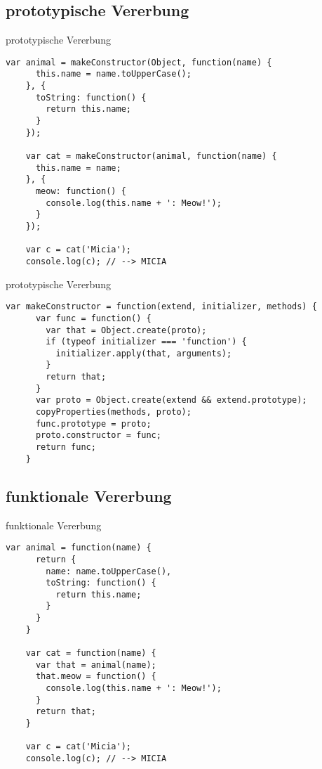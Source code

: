 \subsection{prototypische Vererbung}

\begin{frame}[fragile]{prototypische Vererbung}
  \begin{lstlisting}[gobble=4]
    var animal = makeConstructor(Object, function(name) {
      this.name = name.toUpperCase();
    }, {
      toString: function() {
        return this.name;
      }
    });
    
    var cat = makeConstructor(animal, function(name) {
      this.name = name;
    }, {
      meow: function() {
        console.log(this.name + ': Meow!');
      }
    });
    
    var c = cat('Micia');
    console.log(c); // --> MICIA
  \end{lstlisting}
\end{frame}

\begin{frame}[fragile]{prototypische Vererbung}
  \begin{lstlisting}[gobble=4]
    var makeConstructor = function(extend, initializer, methods) {
      var func = function() {
        var that = Object.create(proto);
        if (typeof initializer === 'function') {
          initializer.apply(that, arguments);
        }
        return that;
      }
      var proto = Object.create(extend && extend.prototype);
      copyProperties(methods, proto);
      func.prototype = proto;
      proto.constructor = func;
      return func;
    }
  \end{lstlisting}
\end{frame}

\subsection{funktionale Vererbung}

\begin{frame}[fragile]{funktionale Vererbung}
  \begin{lstlisting}[gobble=4]
    var animal = function(name) {
      return {
        name: name.toUpperCase(),
        toString: function() {
          return this.name;
        }
      }
    }
    
    var cat = function(name) {
      var that = animal(name);
      that.meow = function() {
        console.log(this.name + ': Meow!');
      }
      return that;
    }
    
    var c = cat('Micia');
    console.log(c); // --> MICIA
  \end{lstlisting}
\end{frame}

